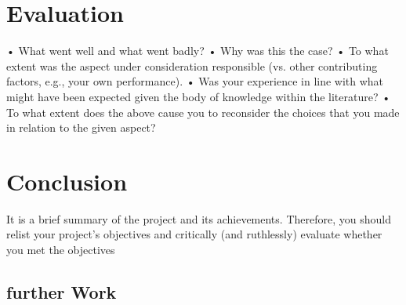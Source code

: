 \section{Evaluation}
•	What went well and what went badly?  
•	Why was this the case?  
•	To what extent was the aspect under consideration responsible (vs. other contributing factors, e.g., your own performance).
•	Was your experience in line with what might have been expected given the body of knowledge within the literature?
•	To what extent does the above cause you to reconsider the choices that you made in relation to the given aspect?

\section{Conclusion}
It is a brief summary of the project and its achievements. Therefore, you should relist your project’s objectives and critically (and ruthlessly) evaluate whether you met the objectives
\subsection{further Work}

